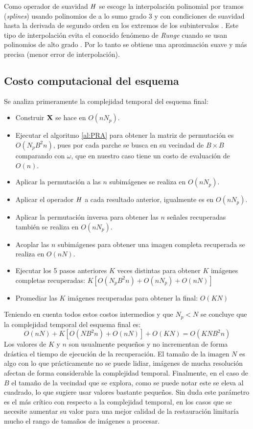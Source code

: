 Como operador de suavidad $\mathit{H}$ se escoge la interpolaci\'on polinomial por tramos (\textit{splines}) usando polinomios de a lo sumo grado $3$ y con condiciones de suavidad hasta la derivada de segundo orden en los extremos de los subintervalos \cite{burden1996analisis}. Este tipo de interpolaci\'on evita el conocido fen\'omeno de \textit{Runge} cuando se usan polinomios de alto grado \cite{quarteroni2014approximation}. Por lo tanto se obtiene una aproximación suave y m\'as precisa (menor error de interpolación).

\subsection{Costo computacional del esquema}

Se analiza primeramente la complejidad temporal del esquema final:

\begin{itemize}
	\item Construir $\mathbf{X}$ se hace en $O(nN_p)$.
	\item Ejecutar el algoritmo \ref{al:PRA} para obtener la matriz de permutaci\'on es $O(N_pB^2n)$, pues por cada parche se busca en su vecindad de $B \times B$ comparando con $\omega$, que en nuestro caso tiene un costo de evaluaci\'on de $O(n)$.
	\item Aplicar la permutaci\'on a las $n$ subim\'agenes se realiza en $O(nN_p)$.
	\item Aplicar el operador $\mathit{H}$ a cada resultado anterior, igualmente es en $O(nN_p)$.
	\item Aplicar la permutaci\'on inversa para obtener las $n$ señales recuperadas también se realiza en $O(nN_p)$.
	\item Acoplar las $n$ subim\'agenes para obtener una imagen completa recuperada se realiza en $O(nN)$.
	\item Ejecutar los 5 pasos anteriores $K$ veces distintas para obtener $K$ im\'agenes completas recuperadas: $K[O(N_pB^2n) + O(nN_p) + O(nN)]$
	\item Promediar las $K$ im\'agenes recuperadas para obtener la final: $O(KN)$
\end{itemize}

Teniendo en cuenta todos estos costos intermedios y que $N_p < N$ se concluye que la complejidad temporal del esquema final es:
\begin{equation}
	O(nN) + K[O(NB^2n) + O(nN)] + O(KN) = \boxed{O(KNB^2n)}
	\label{eq:temporal_complexity}
\end{equation}
Los valores de $K$ y $n$ son usualmente pequeños y no incrementan de forma drástica el tiempo de ejecuci\'on de la recuperaci\'on. El tamaño de la imagen $N$ es algo con lo que pr\'acticamente no se puede lidiar, im\'agenes de mucha resoluci\'on afectan de forma considerable la complejidad temporal. Finalmente, en el caso de $B$ el tamaño de la vecindad que se explora, como se puede notar este se eleva al cuadrado, lo que sugiere usar valores bastante pequeños. Sin duda este par\'ametro es el m\'as cr\'itico con respecto a la complejidad temporal, en los casos que se necesite aumentar su valor para una mejor calidad de la restauraci\'on limitar\'ia mucho el rango de tamaños de im\'agenes a procesar.

